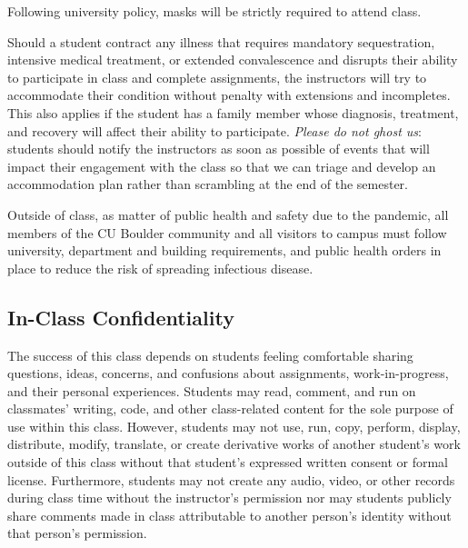 \documentclass[10pt]{memoir}
\begin{document}
Following university policy, masks will be strictly required to attend class.

Should a student contract any illness that requires mandatory sequestration, intensive medical treatment, or extended convalescence and disrupts their ability to participate in class and complete assignments, the instructors will try to accommodate their condition without penalty with extensions and incompletes. This also applies if the student has a family member whose diagnosis, treatment, and recovery will affect their ability to participate. \textit{Please do not ghost us}: students should notify the instructors as soon as possible of events that will impact their engagement with the class so that we can triage and develop an accommodation plan rather than scrambling at the end of the semester.

Outside of class, as matter of public health and safety due to the pandemic, all members of the CU Boulder community and all visitors to campus must follow university, department and building requirements, and public health orders in place to reduce the risk of spreading infectious disease. 

\subsection{In-Class Confidentiality}
The success of this class depends on students feeling comfortable sharing questions, ideas, concerns, and confusions about assignments, work-in-progress, and their personal experiences. Students may read, comment, and run on classmates' writing, code, and other class-related content for the sole purpose of use within this class. However, students may not use, run, copy, perform, display, distribute, modify, translate, or create derivative works of another student's work outside of this class without that student's expressed written consent or formal license. Furthermore, students may not create any audio, video, or other records during class time without the instructor's permission nor may students publicly share comments made in class attributable to another person's identity without that person's permission.

\end{document}
